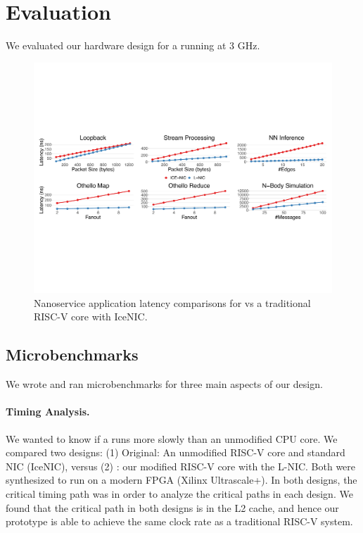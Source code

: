 \section{Evaluation}
\label{sec:evaluation}
We evaluated our hardware design for a \name{} running at 3 GHz. 

\begin{figure}
  \includegraphics[width=\linewidth]{./figures/latency}
  \caption{Nanoservice application latency comparisons for \name{} vs a traditional RISC-V core with IceNIC.}
  \label{fig:latency}
\end{figure}


\subsection{Microbenchmarks}
We wrote and ran microbenchmarks for three main aspects of our \name{} design. 

\noindent\paragraph{Timing Analysis.} We wanted to know if a \name{} runs more slowly than an unmodified CPU core. We compared two designs: (1) Original: An unmodified RISC-V core and standard NIC (IceNIC), versus (2) \name{}: our modified RISC-V core with the L-NIC. Both were synthesized to run on a modern FPGA (Xilinx Ultrascale+). In both designs, the critical timing path was  in order to analyze the critical paths in each design.
We found that the critical path in both designs is in the L2 cache, and hence our \name{} prototype is able to achieve the same clock rate as a traditional RISC-V system.

